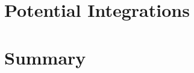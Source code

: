 \section{Potential Integrations}\label{sec:opal-potential-integrations}


%

\section{Summary}\label{sec:opal-summary}

%

%
%

